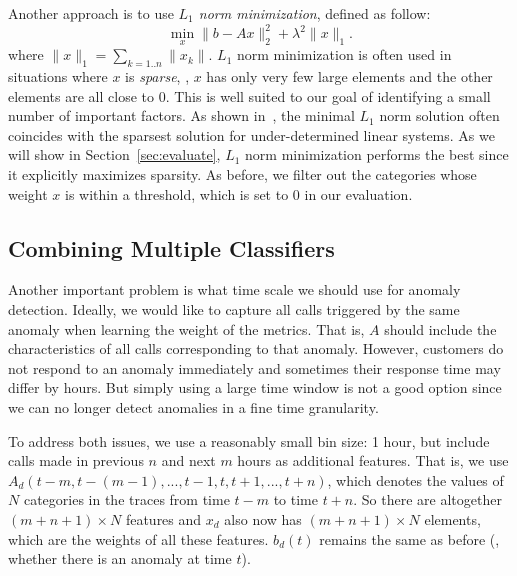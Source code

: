  Another approach 
is to use
{\em $L_1$ norm minimization}, defined as follow: 
\begin{equation}
\min_x \|{b} - A {x}\|_2^2 + \lambda^2 \|{x}\|_1.
\label{eqn:L1:0}
\end{equation}
where $\|{x}\|_1 = \sum_{k=1..n} \|x_k\|$. 
$L_1$ norm minimization is often used in situations where 
$x$ 
is
{\em sparse}, \ie, $x$ has only very few large elements and the
other elements are all close to $0$. This is well suited to our goal
of identifying a small number of important factors. As shown
in~\cite{donoho-L1-1}, the minimal $L_1$ norm solution often coincides
with the sparsest solution for under-determined linear systems. As we
will show in Section~\ref{sec:evaluate}, $L_1$ norm minimization performs
the best since it explicitly maximizes sparsity. As before, we filter out the categories whose weight $x$ is within a
threshold, which is set to 0 in our evaluation. 


\subsection{Combining Multiple Classifiers}
\label{ssec:aggregation}

Another important problem is what time scale we should use for anomaly
detection. Ideally, we would like to capture all calls triggered
by the same anomaly when learning the weight of the metrics. That is,
$A$ should include the characteristics of all calls corresponding to
that anomaly. However, customers do not respond to an anomaly
immediately and sometimes their response time may differ by hours. But
simply using a large time window is not a good option since we can no longer
detect anomalies in a fine time granularity. 

To address both issues, we use a reasonably small bin size: 1 hour, but include
calls made in previous $n$ and next $m$ hours as additional
features. That is, we use $A_d(t-m,t-(m-1),...,t-1,t,t+1,...,t+n)$, which denotes the values of 
$N$ categories in the traces from time $t-m$ to time $t+n$. 
So there are altogether $(m+n+1) \times N$ features and $x_d$ also now
has $(m+n+1) \times N$ elements, which are the weights of all these
features. $b_d(t)$ remains the same as before (\ie, whether there is
an anomaly at time $t$).

